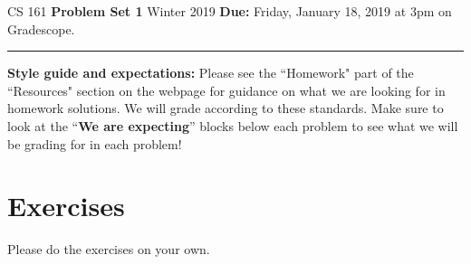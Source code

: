 \documentclass{article}
\begin{document}
\noindent
CS 161 \hfill \textbf{Problem Set 1} \newline 
{Winter 2019} \hfill \textbf{Due:} Friday, January 18, 2019 at 3pm on Gradescope.

\noindent
\rule{\linewidth}{0.4pt}

\noindent
\textbf{Style guide and expectations:} Please see the ``Homework" part of the ``Resources" section on the webpage for guidance on what we are looking for in homework solutions.  We will grade according to these standards.
\newline\newline
Make sure to look at the ``\textbf{We are expecting}'' blocks below each problem to see what we will be grading for in each problem!

\section*{Exercises}
Please do the exercises on your own.
\end{document}
